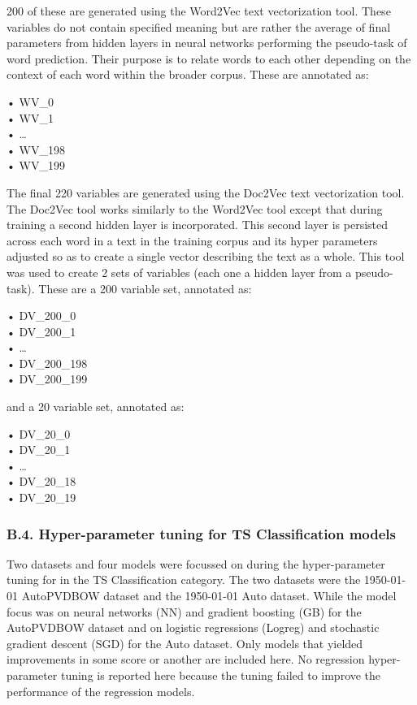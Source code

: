 \documentclass[11pt,preprint, authoryear]{elsarticle}
\numberwithin{equation}{section}
\numberwithin{figure}{section}
\numberwithin{table}{section}
\begin{document}
200 of these are generated using the Word2Vec text vectorization tool.
These variables do not contain specified meaning but are rather the
average of final parameters from hidden layers in neural networks
performing the pseudo-task of word prediction. Their purpose is to
relate words to each other depending on the context of each word within
the broader corpus. These are annotated as:

• WV\_0\\
• WV\_1\\
• \ldots{}\\
• WV\_198\\
• WV\_199

The final 220 variables are generated using the Doc2Vec text
vectorization tool. The Doc2Vec tool works similarly to the Word2Vec
tool except that during training a second hidden layer is incorporated.
This second layer is persisted across each word in a text in the
training corpus and its hyper parameters adjusted so as to create a
single vector describing the text as a whole. This tool was used to
create 2 sets of variables (each one a hidden layer from a pseudo-task).
These are a 200 variable set, annotated as:

• DV\_200\_0\\
• DV\_200\_1\\
• \ldots{}\\
• DV\_200\_198\\
• DV\_200\_199

and a 20 variable set, annotated as:

• DV\_20\_0\\
• DV\_20\_1\\
• \ldots{}\\
• DV\_20\_18\\
• DV\_20\_19

\hypertarget{b.4.-hyper-parameter-tuning-for-ts-classification-models}{%
\subsubsection*{B.4. Hyper-parameter tuning for TS Classification
models}\label{b.4.-hyper-parameter-tuning-for-ts-classification-models}}

Two datasets and four models were focussed on during the hyper-parameter
tuning for in the TS Classification category. The two datasets were the
1950-01-01 AutoPVDBOW dataset and the 1950-01-01 Auto dataset. While the
model focus was on neural networks (NN) and gradient boosting (GB) for
the AutoPVDBOW dataset and on logistic regressions (Logreg) and
stochastic gradient descent (SGD) for the Auto dataset. Only models that
yielded improvements in some score or another are included here. No
regression hyper-parameter tuning is reported here because the tuning
failed to improve the performance of the regression models.
\end{document}

